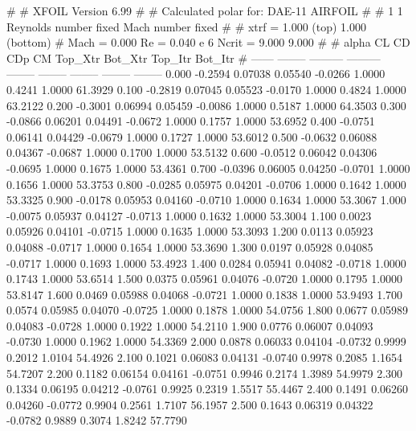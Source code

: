 #  
#       XFOIL         Version 6.99
#  
# Calculated polar for: DAE-11 AIRFOIL                                  
#  
# 1 1 Reynolds number fixed          Mach number fixed         
#  
# xtrf =   1.000 (top)        1.000 (bottom)  
# Mach =   0.000     Re =     0.040 e 6     Ncrit =   9.000  9.000
#  
#   alpha    CL        CD       CDp       CM     Top_Xtr  Bot_Xtr  Top_Itr  Bot_Itr
#  ------ -------- --------- --------- -------- -------- -------- -------- --------
   0.000  -0.2594   0.07038   0.05540  -0.0266   1.0000   0.4241   1.0000  61.3929
   0.100  -0.2819   0.07045   0.05523  -0.0170   1.0000   0.4824   1.0000  63.2122
   0.200  -0.3001   0.06994   0.05459  -0.0086   1.0000   0.5187   1.0000  64.3503
   0.300  -0.0866   0.06201   0.04491  -0.0672   1.0000   0.1757   1.0000  53.6952
   0.400  -0.0751   0.06141   0.04429  -0.0679   1.0000   0.1727   1.0000  53.6012
   0.500  -0.0632   0.06088   0.04367  -0.0687   1.0000   0.1700   1.0000  53.5132
   0.600  -0.0512   0.06042   0.04306  -0.0695   1.0000   0.1675   1.0000  53.4361
   0.700  -0.0396   0.06005   0.04250  -0.0701   1.0000   0.1656   1.0000  53.3753
   0.800  -0.0285   0.05975   0.04201  -0.0706   1.0000   0.1642   1.0000  53.3325
   0.900  -0.0178   0.05953   0.04160  -0.0710   1.0000   0.1634   1.0000  53.3067
   1.000  -0.0075   0.05937   0.04127  -0.0713   1.0000   0.1632   1.0000  53.3004
   1.100   0.0023   0.05926   0.04101  -0.0715   1.0000   0.1635   1.0000  53.3093
   1.200   0.0113   0.05923   0.04088  -0.0717   1.0000   0.1654   1.0000  53.3690
   1.300   0.0197   0.05928   0.04085  -0.0717   1.0000   0.1693   1.0000  53.4923
   1.400   0.0284   0.05941   0.04082  -0.0718   1.0000   0.1743   1.0000  53.6514
   1.500   0.0375   0.05961   0.04076  -0.0720   1.0000   0.1795   1.0000  53.8147
   1.600   0.0469   0.05988   0.04068  -0.0721   1.0000   0.1838   1.0000  53.9493
   1.700   0.0574   0.05985   0.04070  -0.0725   1.0000   0.1878   1.0000  54.0756
   1.800   0.0677   0.05989   0.04083  -0.0728   1.0000   0.1922   1.0000  54.2110
   1.900   0.0776   0.06007   0.04093  -0.0730   1.0000   0.1962   1.0000  54.3369
   2.000   0.0878   0.06033   0.04104  -0.0732   0.9999   0.2012   1.0104  54.4926
   2.100   0.1021   0.06083   0.04131  -0.0740   0.9978   0.2085   1.1654  54.7207
   2.200   0.1182   0.06154   0.04161  -0.0751   0.9946   0.2174   1.3989  54.9979
   2.300   0.1334   0.06195   0.04212  -0.0761   0.9925   0.2319   1.5517  55.4467
   2.400   0.1491   0.06260   0.04260  -0.0772   0.9904   0.2561   1.7107  56.1957
   2.500   0.1643   0.06319   0.04322  -0.0782   0.9889   0.3074   1.8242  57.7790
